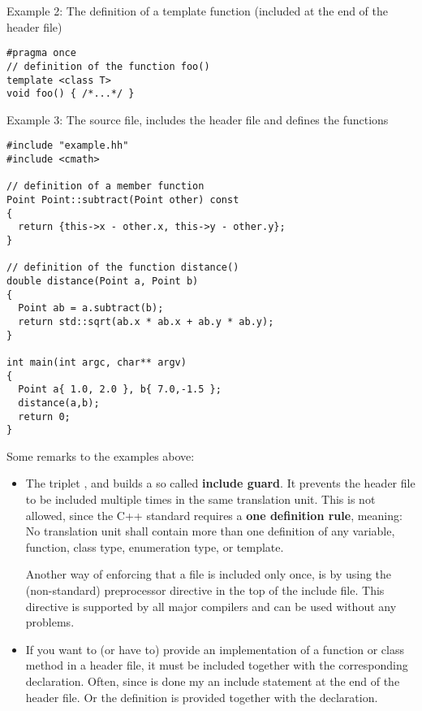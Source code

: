 Example 2: The definition of a template function (included at the end of the header file)

\begin{verbatim}
#pragma once
// definition of the function foo()
template <class T>
void foo() { /*...*/ }
\end{verbatim}

Example 3: The source file, includes the header file and defines the functions

\begin{verbatim}
#include "example.hh"
#include <cmath>

// definition of a member function
Point Point::subtract(Point other) const
{
  return {this->x - other.x, this->y - other.y};
}

// definition of the function distance()
double distance(Point a, Point b)
{
  Point ab = a.subtract(b);
  return std::sqrt(ab.x * ab.x + ab.y * ab.y);
}

int main(int argc, char** argv)
{
  Point a{ 1.0, 2.0 }, b{ 7.0,-1.5 };
  distance(a,b);
  return 0;
}
\end{verbatim}


Some remarks to the examples above:
\begin{itemize}
  \item The triplet ,  and  builds a so called \textbf{include guard}. It prevents the header file
    to be included multiple times in the same translation unit. This is not allowed, since the C++ standard requires a \textbf{one definition rule},
    meaning: No translation unit shall contain more than one definition of any variable, function, class type, enumeration type, or template.

    Another way of enforcing that a file is included only once, is by using the (non-standard) preprocessor directive  in the
    top of the include file. This directive is supported by all major compilers and can be used without any problems.

  \item If you want to (or have to) provide an implementation of a function or class method in a header file, it must be included together with
    the corresponding declaration. Often, since is done my an include statement at the end of the header file. Or the definition is provided
    together with the declaration.
\end{itemize}



